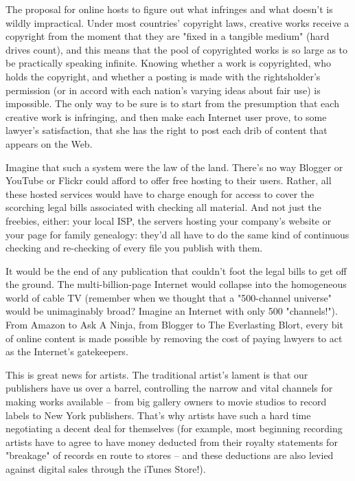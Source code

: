 The proposal for online hosts to figure out what infringes and what
doesn't is wildly impractical. Under most countries' copyright
laws, creative works receive a copyright from the moment that they
are "fixed in a tangible medium" (hard drives count), and this
means that the pool of copyrighted works is so large as to be
practically speaking infinite. Knowing whether a work is
copyrighted, who holds the copyright, and whether a posting is made
with the rightsholder's permission (or in accord with each nation's
varying ideas about fair use) is impossible. The only way to be
sure is to start from the presumption that each creative work is
infringing, and then make each Internet user prove, to some
lawyer's satisfaction, that she has the right to post each drib of
content that appears on the Web.

Imagine that such a system were the law of the land. There's no way
Blogger or YouTube or Flickr could afford to offer free hosting to
their users. Rather, all these hosted services would have to charge
enough for access to cover the scorching legal bills associated
with checking all material. And not just the freebies, either: your
local ISP, the servers hosting your company's website or your page
for family genealogy: they'd all have to do the same kind of
continuous checking and re-checking of every file you publish with
them.

It would be the end of any publication that couldn't foot the legal
bills to get off the ground. The multi-billion-page Internet would
collapse into the homogeneous world of cable TV (remember when we
thought that a "500-channel universe" would be unimaginably broad?
Imagine an Internet with only 500 "channels!"). From Amazon to Ask
A Ninja, from Blogger to The Everlasting Blort, every bit of online
content is made possible by removing the cost of paying lawyers to
act as the Internet's gatekeepers.

This is great news for artists. The traditional artist's lament is
that our publishers have us over a barrel, controlling the narrow
and vital channels for making works available -- from big gallery
owners to movie studios to record labels to New York publishers.
That's why artists have such a hard time negotiating a decent deal
for themselves (for example, most beginning recording artists have
to agree to have money deducted from their royalty statements for
"breakage" of records en route to stores -- and these deductions
are also levied against digital sales through the iTunes Store!).

